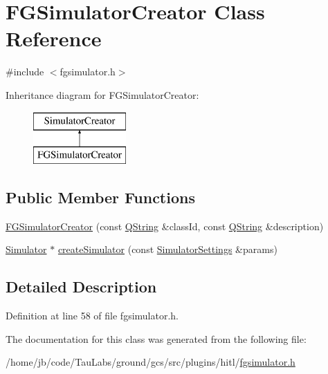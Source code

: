 \hypertarget{class_f_g_simulator_creator}{\section{\-F\-G\-Simulator\-Creator \-Class \-Reference}
\label{class_f_g_simulator_creator}
}


{\ttfamily \#include $<$fgsimulator.\-h$>$}

\-Inheritance diagram for \-F\-G\-Simulator\-Creator\-:\begin{figure}[H]
\begin{center}
\leavevmode
\includegraphics[height=2.000000cm]{class_f_g_simulator_creator}
\end{center}
\end{figure}
\subsection*{\-Public \-Member \-Functions}
\begin{DoxyCompactItemize}
\item 
\hyperlink{group___h_i_t_l_plugin_ga5a9c061b4c449fceecb71b3e00412cd3}{\-F\-G\-Simulator\-Creator} (const \hyperlink{group___u_a_v_objects_plugin_gab9d252f49c333c94a72f97ce3105a32d}{\-Q\-String} \&class\-Id, const \hyperlink{group___u_a_v_objects_plugin_gab9d252f49c333c94a72f97ce3105a32d}{\-Q\-String} \&description)
\item 
\hyperlink{class_simulator}{\-Simulator} $\ast$ \hyperlink{group___h_i_t_l_plugin_gae7287ea22cde35ce9042e313d9d7c14f}{create\-Simulator} (const \hyperlink{group___h_i_t_l_plugin_ga052199f1328d3002bce3e45345aa7f4e}{\-Simulator\-Settings} \&params)
\end{DoxyCompactItemize}


\subsection{\-Detailed \-Description}


\-Definition at line 58 of file fgsimulator.\-h.



\-The documentation for this class was generated from the following file\-:\begin{DoxyCompactItemize}
\item 
/home/jb/code/\-Tau\-Labs/ground/gcs/src/plugins/hitl/\hyperlink{fgsimulator_8h}{fgsimulator.\-h}\end{DoxyCompactItemize}

